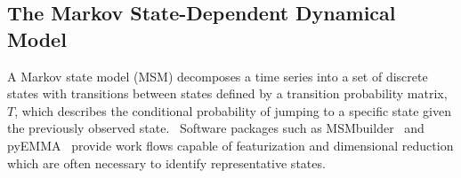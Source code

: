 \documentclass{article}
\begin{document}




  \subsection{The Markov State-Dependent Dynamical Model}\label{method:MSMs}  

  A Markov state model (MSM) decomposes a time series into a set of discrete states
  with transitions between states defined by a transition probability matrix, $T$,
  which describes the conditional probability of jumping to a specific state given
  the previously observed state.~\cite{pande_everything_2010,wehmeyer_introduction_2018}
  Software packages such as MSMbuilder~\cite{beauchamp_msmbuilder2:_2011} and 
  pyEMMA~\cite{scherer_pyemma_2015} provide work flows capable of featurization and
  dimensional reduction which are often necessary to identify representative states.
\end{document}
